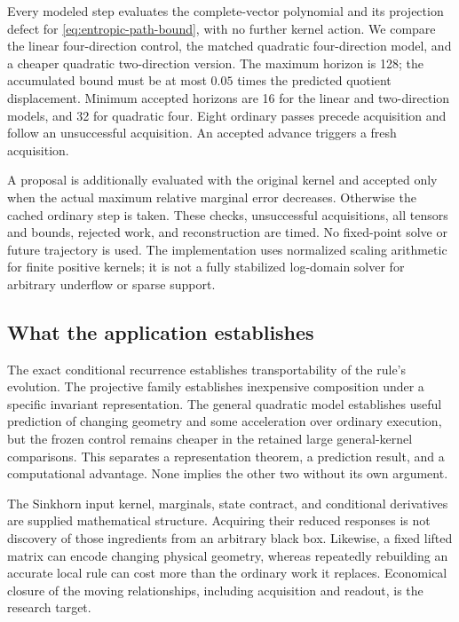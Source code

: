 Every modeled step evaluates the complete-vector polynomial and its
projection defect for \eqref{eq:entropic-path-bound}, with no further kernel
action. We compare the linear four-direction control, the matched quadratic
four-direction model, and a cheaper quadratic two-direction version.
The maximum horizon is 128; the accumulated bound must be at most $0.05$
times the predicted quotient displacement. Minimum accepted horizons are
16 for the linear and two-direction models, and 32 for quadratic four.
Eight ordinary passes precede acquisition and follow an unsuccessful
acquisition. An accepted advance triggers a fresh acquisition.

A proposal is additionally evaluated with the original kernel and accepted
only when the actual maximum relative marginal error decreases. Otherwise
the cached ordinary step is taken. These checks, unsuccessful acquisitions,
all tensors and bounds, rejected work, and reconstruction are timed.
No fixed-point solve or future trajectory is used. The implementation uses
normalized scaling arithmetic for finite positive kernels; it is not a
fully stabilized log-domain solver for arbitrary underflow or sparse support.



\subsection{What the application establishes}
The exact conditional recurrence establishes transportability of the rule's
evolution. The projective family establishes inexpensive composition under
a specific invariant representation. The general quadratic model establishes
useful prediction of changing geometry and some acceleration over ordinary
execution, but the frozen control remains cheaper in the retained large
general-kernel comparisons. This separates a representation theorem, a
prediction result, and a computational advantage. None implies the other
two without its own argument.

The Sinkhorn input kernel, marginals, state contract, and conditional
derivatives are supplied mathematical structure. Acquiring their reduced
responses is not discovery of those ingredients from an arbitrary black box.
Likewise, a fixed lifted matrix can encode changing physical geometry,
whereas repeatedly rebuilding an accurate local rule can cost more than
the ordinary work it replaces. Economical closure of the moving relationships,
including acquisition and readout, is the research target.
